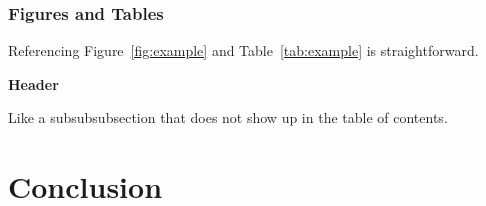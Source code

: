 \documentclass[12pt, twoside]{article}
\newcommand{\header}[1]{%
    \vspace{1\baselineskip}
    \noindent\textbf{#1}%
}
\begin{document}
\subsubsection{Figures and Tables}
Referencing Figure~\ref{fig:example} and Table~\ref{tab:example} is straightforward.

\header{Header}

Like a subsubsubsection that does not show up in the table of contents.



\section{Conclusion}
\lipsum[6] %
\cite{vaswani2017}

\newpage

\medskip

\printbibliography
\end{document}
